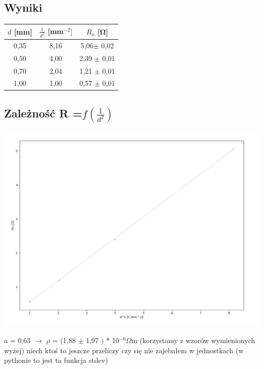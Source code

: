 \documentclass{article}
\begin{document}
\subsection{Wyniki}
\begin{center}
\begin{tabular}{ c|c | c }
$d$ [mm] & $\frac{1}{d^2}$ [mm$^{-2}]$ &$R_x$ [\si{\ohm}]\\
\hline
0,35 & 8,16 & 5,06$\pm$ 0,02\\ 
 0,50 & 4,00 &2,39 $\pm$ 0,01\\ 
 0,70 & 2,04 &1,21 $\pm$ 0,01\\ 
 1,00 & 1,00 &0,57 $\pm$ 0,01\\ 
 
\end{tabular}
\end{center}

\subsection {Zależność R =$ f(\frac{1}{d^2})$}
\begin{center}
\includegraphics[width=15cm]{e3_wykres}
\end{center}
a = 0,63 $\rightarrow$ $\rho$ = (1,88  $\pm$ 1,97 ) * 10$^{-6} \Omega$m (korzystamy z wzorów wymienionych wyżej)
niech ktoś to jeszcze przeliczy czy się nie zajebałem w jednostkach (w pythonie to jest ta funkcja stdev)
\end{document}
